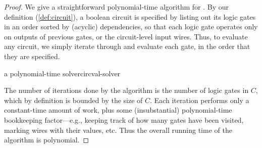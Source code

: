\begin{proof}

  We give a straightforward polynomial-time algorithm for .  By our definition (\cref{def:circuit}), a boolean circuit is
  specified by listing out its logic gates in an order sorted by (acyclic)
  dependencies, so that each logic gate operates only on outputs of previous
  gates, or the circuit-level input wires.  Thus, to evaluate any circuit, we
  simply iterate through and evaluate each gate, in the order that they are
  specified.


  \begin{algorithm}{a polynomial-time \CircVal{} solver}{circval-solver}
    \begin{algorithmic}
      \EndIf
      \EndFor
    \end{algorithmic}
  \end{algorithm}

  The number of iterations done by the algorithm is the number of logic gates in
  \(C\), which by definition is bounded by the size of \(C\).  Each iteration
  performs only a constant-time amount of work, plus some (insubstantial)
  polynomial-time bookkeeping factor—e.g., keeping track of how many gates have
  been visited, marking wires with their values, etc.  Thus the overall running
  time of the algorithm is polynomial.


\end{proof}
